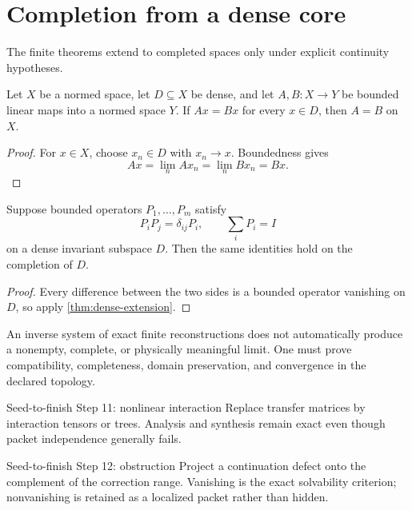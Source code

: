 \section{Completion from a dense core}
The finite theorems extend to completed spaces only under explicit continuity hypotheses.

\begin{theorem}\label{thm:dense-extension}
Let $X$ be a normed space, let $D\subseteq X$ be dense, and let $A,B:X\to Y$ be bounded linear maps into a normed space $Y$.  If $Ax=Bx$ for every $x\in D$, then $A=B$ on $X$.
\end{theorem}

\begin{proof}
For $x\in X$, choose $x_n\in D$ with $x_n\to x$.  Boundedness gives
\[
Ax=\lim_nAx_n=\lim_nBx_n=Bx.
\]
\end{proof}

\begin{corollary}\label{cor:packet-completion}
Suppose bounded operators $P_1,\ldots,P_m$ satisfy
\[
P_iP_j=\delta_{ij}P_i,
\qquad
\sum_iP_i=I
\]
on a dense invariant subspace $D$.  Then the same identities hold on the completion of $D$.
\end{corollary}

\begin{proof}
Every difference between the two sides is a bounded operator vanishing on $D$, so apply \cref{thm:dense-extension}.
\end{proof}

\begin{boundarybox}
An inverse system of exact finite reconstructions does not automatically produce a nonempty, complete, or physically meaningful limit.  One must prove compatibility, completeness, domain preservation, and convergence in the declared topology.
\end{boundarybox}

\begin{stepbox}{Seed-to-finish Step 11: nonlinear interaction}
Replace transfer matrices by interaction tensors or trees.  Analysis and synthesis remain exact even though packet independence generally fails.
\end{stepbox}

\begin{stepbox}{Seed-to-finish Step 12: obstruction}
Project a continuation defect onto the complement of the correction range.  Vanishing is the exact solvability criterion; nonvanishing is retained as a localized packet rather than hidden.
\end{stepbox}

